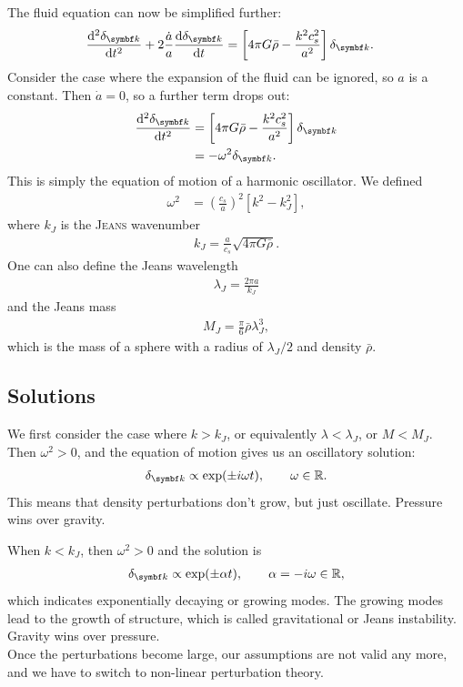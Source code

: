The fluid equation can now be simplified further:
\begin{align*}
	\dv[2]{\delta_{\vec{k}}}{t} + 2 \frac{\dot{a}}{a} \dv{\delta_{\vec{k}}}{t}
	&= \left[4 \pi G \bar{\rho} - \frac{k^2 c_s^2}{a^2}\right] \delta_{\vec{k}}.
\end{align*}
Consider the case where the expansion of the fluid can be ignored, so $a$ is a constant. Then $\dot{a} = 0$, so a further term drops out:
\begin{align*}
	\dv[2]{\delta_{\vec{k}}}{t}
	&= \left[4 \pi G \bar{\rho} - \frac{k^2 c_s^2}{a^2}\right] \delta_{\vec{k}}\\
	&= - \omega^2 \delta_{\vec{k}}.
\end{align*}
This is simply the equation of motion of a harmonic oscillator. We defined
\begin{align*}
	\omega^2
	&= \left( \frac{c_s}{a} \right)^2 [k^2 - k_J^2],
\end{align*}
where $k_J$ is the \textsc{Jeans} wavenumber
\begin{align*}
	k_J = \frac{a}{c_s} \sqrt{4 \pi G \bar{\rho}}.
\end{align*}
One can also define the Jeans wavelength
\begin{align*}
	\lambda_J = \frac{2 \pi a}{k_J}
\end{align*}
and the Jeans mass
\begin{align*}
	M_J = \frac{\pi}{6} \bar{\rho} \lambda_J^3,
\end{align*}
which is the mass of a sphere with a radius of $\lambda_J/2$ and density $\bar{\rho}$.

\subsection{Solutions}

We first consider the case where $k > k_J$, or equivalently $\lambda < \lambda_J$, or $M < M_J$. Then $\omega^2 > 0$, and the equation of motion gives us an oscillatory solution:
\begin{align*}
	\delta_{\vec{k}} \propto \exp(\pm i \omega t),
	\qquad \omega \in \R.
\end{align*}
This means that density perturbations don't grow, but just oscillate. Pressure wins over gravity. 

When $k < k_J$, then $\omega^2 > 0$ and the solution is
\begin{align*}
	\delta_{\vec{k}} \propto \exp(\pm \alpha t), \qquad \alpha = -i \omega \in \R,
\end{align*}
which indicates exponentially decaying or growing modes. The growing modes lead to the growth of structure, which is called gravitational or Jeans instability. Gravity wins over pressure. \\
Once the perturbations become large, our assumptions are not valid any more, and we have to switch to non-linear perturbation theory.

